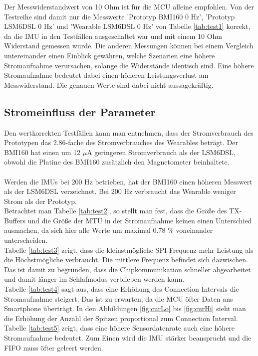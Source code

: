 Der Messwiderstandwert von 10 Ohm ist für die MCU alleine empfohlen.
Von der Testreihe sind damit nur die Messwerte 'Prototyp BMI160 0 Hz', 'Prototyp LSM6DSL 0 Hz' und 'Wearable LSM6DSL 0 Hz' von Tabelle \ref{tab:test1} korrekt, da die IMU in den Testfällen ausgeschaltet war und mit einem 10 Ohm Widerstand gemessen wurde.
Die anderen Messungen können bei einem Vergleich untereinander einen Einblick gewähren, welche Szenarien eine höhere Stromaufnahme verursachen, solange die Widerstände identisch sind.
Eine höhere Stromaufnahme bedeutet dabei einen höheren Leistungsverlust am Messwiderstand.
Die genauen Werte sind dabei nicht aussagekräftig.

\subsection{Stromeinfluss der Parameter}
Den wertkorrekten Testfällen kann man entnehmen, dass der Stromverbrauch des Prototypen das 2.86-fache des Stromverbrauches des Wearables beträgt.
Der BMI160 hat einen um 12 $\mu$A geringeren Stromverbrauch als der LSM6DSL, obwohl die Platine des BMI160 zusätzlich den Magnetometer beinhaltete.\\\\
Werden die IMUs bei 200 Hz betrieben, hat der BMI160 einen höheren Messwert als der LSM6DSL verzeichnet.
Bei 200 Hz verbraucht das Wearable weniger Strom als der Prototyp.\\
Betrachtet man Tabelle \ref{tab:test2}, so stellt man fest, dass die Größe des TX-Buffers und die Größe der MTU in der Stromaufnahme keinen einen Unterschied ausmachen, da sich hier alle Werte um maximal 0.78 \% voneinander unterscheiden.\\
Tabelle \ref{tab:test3} zeigt, dass die kleinstmögliche SPI-Frequenz mehr Leistung als die Höchstmögliche verbraucht.
Die mittlere Frequenz befindet sich dazwischen.
Das ist damit zu begründen, dass die Chipkommunikation schneller abgearbeitet und damit länger im Schlafmodus verblieben werden kann.\\
Tabelle \ref{tab:test4} sagt aus, dass eine Erhöhung des Connection Intervals die Stromaufnahme steigert.
Das ist zu erwarten, da die MCU öfter Daten ans Smartphone überträgt.
In den Abbildungen \ref{fig:curLo} bis \ref{fig:curHi} sieht man die Erhöhung der Anzahl der Spitzen proportional zum Connection Interval.\\
Tabelle \ref{tab:test5} zeigt, dass eine höhere Sensordatenrate auch eine höhere Stromaufnahme bedeutet.
Zum Einen wird die IMU stärker beansprucht und die FIFO muss öfter geleert werden.
